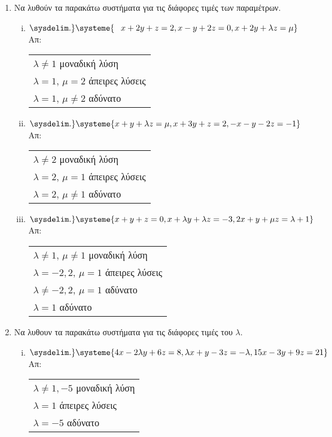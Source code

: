 \documentclass[a4paper,table]{report}
\begin{document}
\begin{center}
  \minibox{\large \bfseries \textcolor{Col1}{Ασκήσεις στα παραμετρικά  συστήματα}}
\end{center}

\vspace{\baselineskip}

\begin{enumerate}
  \setlength{\itemsep}{\baselineskip}
\item Να λυθούν τα παρακάτω συστήματα για τις διάφορες τιμές των παραμέτρων.

  \begin{enumerate}[i)]
    \setlength{\itemsep}{\baselineskip}
\item $\sysdelim.\} \systeme{\phantom{-}x+2y+z=2, x-y+2z=0, x+2y+\lambda z= \mu}$ 
  \hfill Απ: \begin{tabular}{l}
    $\lambda\neq 1$ μοναδική λύση \\
    $\lambda=1$, $\mu=2$ άπειρες λύσεις \\
    $\lambda=1$, $\mu\neq 2$ αδύνατο
  \end{tabular}
\item $\sysdelim.\} \systeme{x+y+\lambda z = \mu, x+3y+z = 2, -x-y-2z = -1}$ 
  \hfill Απ: \begin{tabular}{l}
    $\lambda\neq 2$ μοναδική λύση \\
    $\lambda=2$, $\mu=1$ άπειρες λύσεις \\
    $\lambda=2$, $\mu\neq 1$ αδύνατο
  \end{tabular}

\item $ \sysdelim.\} \systeme{
  x + y + z = 0, 
  x + \lambda y + \lambda z = -3, 
2x + y + \mu z = \lambda + 1 } $ 
\hfill Απ: \begin{tabular}{l}
  $ \lambda \neq 1 $, $ \mu \neq 1 $ μοναδική λύση \\
  $ \lambda = -2,2 $, $ \mu = 1 $ άπειρες λύσεις \\
  $ \lambda \neq -2,2 $, $ \mu = 1 $  αδύνατο \\ 
  $ \lambda = 1 $ αδύνατο  
\end{tabular}

 \end{enumerate}

\item Να λυθουν τα παρακάτω συστήματα για τις διάφορες τιμές του $ \lambda $.

  \begin{enumerate}[i)]
    \setlength{\itemsep}{\baselineskip}
  \item $\sysdelim.\} \systeme{4x-2\lambda y + 6z = 8, \lambda x + y -3z = -\lambda, 15x -3y + 9z = 21
  } $ \hfill Απ: \begin{tabular}{l}
    $\lambda \neq 1,-5 $ μοναδική λύση \\
    $\lambda = 1 $ άπειρες λύσεις \\
    $\lambda =-5 $ αδύνατο
  \end{tabular}



\end{enumerate}
\end{enumerate}
\end{document}

